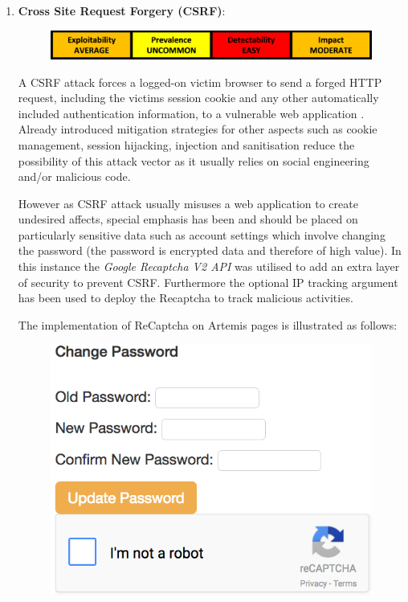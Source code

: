 \begin{enumerate}
    \item \textbf{Cross Site Request Forgery (CSRF)}:
    
    \begin{figure}[h]
    	\centering
    	\includegraphics[scale=0.5,center]{chapters/chapter03/figures/csrfClass.png}
    	\label{CSRF}
    \end{figure}
    

    
    
    A CSRF attack forces a logged-on victim browser to send a forged HTTP request, including the victim\textquotesingle s session cookie and any other automatically included authentication information, to a vulnerable web application \cite{OWASP2017}. Already introduced mitigation strategies for other aspects such as cookie management, session hijacking, injection and sanitisation reduce the possibility of this attack vector as it usually relies on social engineering and/or malicious code.
    
    However as CSRF attack usually misuses a web application to create undesired affects, special emphasis has been  and should be \cite{OWASPa} placed on particularly sensitive data such as account settings which involve changing the password (the password is encrypted data and therefore of high value). In this instance the \textit{Google Recaptcha V2 API} was utilised to add an extra layer of security to prevent CSRF. Furthermore the optional IP tracking argument has been used to deploy the Recaptcha to track malicious activities.
    
    \newpage
    The implementation  of ReCaptcha on Artemis pages is illustrated as follows:
  
    \begin{figure}[h]
    	\centering
    	\includegraphics[scale=0.44,center]{chapters/chapter03/figures/captchaGoogle.png}
    	\label{googleRecaptcha}
    \end{figure}  
    

\end{enumerate}
